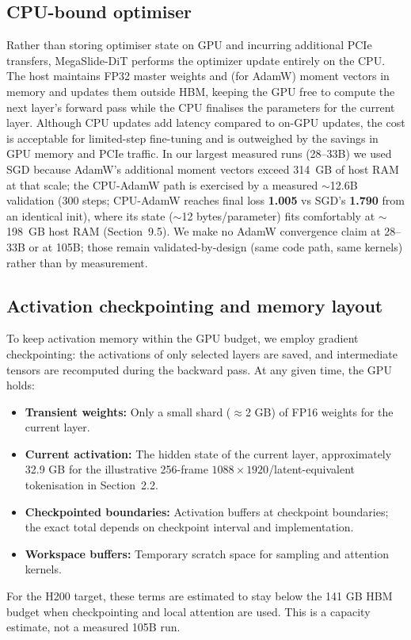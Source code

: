 \documentclass[11pt, letterpaper]{article}
\begin{document}
\subsection{CPU-bound optimiser}
Rather than storing optimiser state on GPU and incurring additional PCIe transfers, MegaSlide-DiT performs the optimizer update entirely on the CPU. The host maintains FP32 master weights and (for AdamW) moment vectors in memory and updates them outside HBM, keeping the GPU free to compute the next layer's forward pass while the CPU finalises the parameters for the current layer. Although CPU updates add latency compared to on-GPU updates, the cost is acceptable for limited-step fine-tuning and is outweighed by the savings in GPU memory and PCIe traffic. In our largest measured runs (28--33B) we used SGD because AdamW's additional moment vectors exceed 314~GB of host RAM at that scale; the CPU-AdamW path is exercised by a measured $\sim$12.6B validation (300 steps; CPU-AdamW reaches final loss \textbf{1.005} vs SGD's \textbf{1.790} from an identical init), where its state ($\sim$12 bytes/parameter) fits comfortably at $\sim$198~GB host RAM (Section~9.5). We make no AdamW convergence claim at 28--33B or at 105B; those remain validated-by-design (same code path, same kernels) rather than by measurement.

\subsection{Activation checkpointing and memory layout}
To keep activation memory within the GPU budget, we employ gradient checkpointing: the activations of only selected layers are saved, and intermediate tensors are recomputed during the backward pass. At any given time, the GPU holds:

\begin{itemize}
    \item \textbf{Transient weights:} Only a small shard ($\approx$2 GB) of FP16 weights for the current layer.
    \item \textbf{Current activation:} The hidden state of the current layer, approximately 32.9 GB for the illustrative 256-frame $1088\times1920$/latent-equivalent tokenisation in Section~2.2.
    \item \textbf{Checkpointed boundaries:} Activation buffers at checkpoint boundaries; the exact total depends on checkpoint interval and implementation.
    \item \textbf{Workspace buffers:} Temporary scratch space for sampling and attention kernels.
\end{itemize}
For the H200 target, these terms are estimated to stay below the 141 GB HBM budget when checkpointing and local attention are used. This is a capacity estimate, not a measured 105B run.
\end{document}
